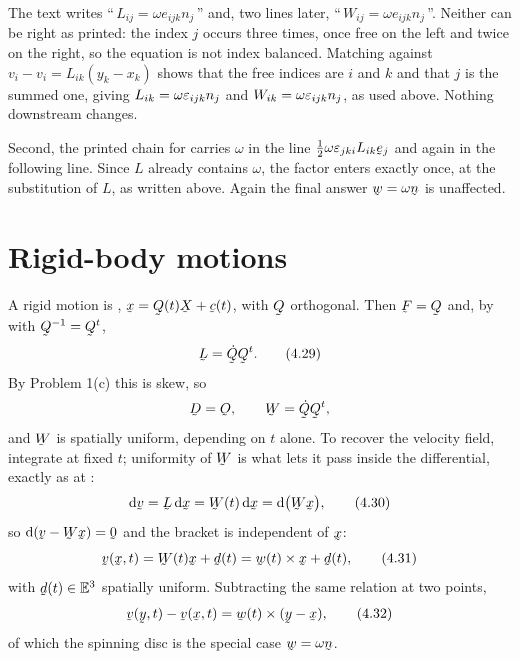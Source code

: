 \begin{remark}
\label{rem:ch4misprint}
The text writes ``\,$L_{ij}=\omega e_{ijk}n_{j}$\,'' and, two lines later,
``\,$W_{ij}=\omega e_{ijk}n_{j}$\,''. Neither can be right as printed:
the index $j$ occurs three times, once free on the left and twice on the
right, so the equation is not index balanced. Matching  against
$v_{i}-v_{i}=L_{ik}(y_{k}-x_{k})$ shows that the free indices are $i$ and
$k$ and that $j$ is the summed one, giving
$L_{ik}=\omega\varepsilon_{ijk}n_{j}$ and $W_{ik}=\omega\varepsilon_{ijk}n_{j}$, as
used above. Nothing downstream changes.

Second, the printed chain for  carries $\omega$ in the line
$\tfrac12\omega\eps_{jki}L_{ik}\be_{j}$ and again in the following line.
Since $L$ already contains $\omega$, the factor enters exactly once, at
the substitution of $L$, as written above. Again the final answer
$\bw=\omega\bn$ is unaffected.
\end{remark}

\section{Rigid-body motions}\label{sec:rigidrate}

A rigid motion is , $\bx=\bQ(t)\bX+\bc(t)$, with $\bQ$
orthogonal. Then $\bF=\bQ$ and, by  with $\bQ^{-1}=\bQ^{t}$,
\begin{equation}
   \bL=\dot\bQ\bQ^{t}.
   \tag{4.29}\label{eq:4.29}
\end{equation}
By Problem 1(c) this is skew, so
\[
   \bD=\Ob,\qquad \bW=\dot\bQ\bQ^{t},
\]
and $\bW$ is spatially uniform, depending on $t$ alone. To recover the
velocity field, integrate at fixed $t$; uniformity of $\bW$ is what lets
it pass inside the differential, exactly as at :
\begin{equation}
   \dl\bv=\bL\,\dl\bx=\bW(t)\,\dl\bx=\dl\big(\bW\bx\big),
   \tag{4.30}\label{eq:4.30}
\end{equation}
so $\dl(\bv-\bW\bx)=\bze$ and the bracket is independent of $\bx$:
\begin{equation}
   \bv(\bx,t)=\bW(t)\bx+\bd(t)=\bw(t)\times\bx+\bd(t),
   \tag{4.31}\label{eq:4.31}
\end{equation}
with $\bd(t)\in\Vt$ spatially uniform. Subtracting the same relation at
two points,
\begin{equation}
   \bv(\by,t)-\bv(\bx,t)=\bw(t)\times(\by-\bx),
   \tag{4.32}\label{eq:4.32}
\end{equation}
of which the spinning disc is the special case $\bw=\omega\bn$.

